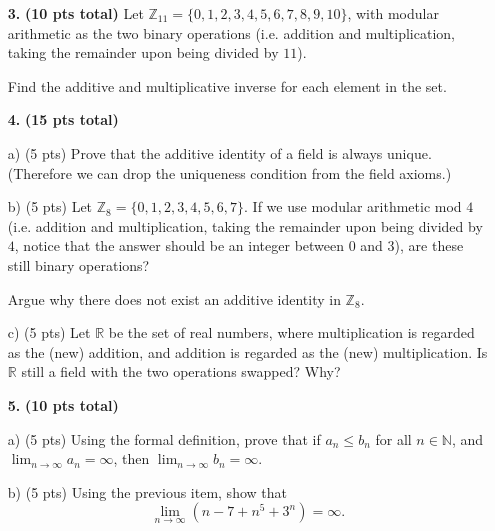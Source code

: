 \documentclass[12pt]{article}
\begin{document}
\begin{itemize}
\vspace*{3mm} 

\item[{\bf 3.}] {\bf (10 pts total)} Let $\mathbb{Z}_{11}=\{0,1,2,3,4,5,6,7,8,9,10\}$, with modular arithmetic as the two binary operations (i.e. addition and multiplication, taking the remainder upon being divided by $11$).

Find the additive and multiplicative inverse for each element in the set.


\vspace*{2mm} 
\item[{\bf 4.}] {\bf (15 pts total)}



a) (5 pts) Prove that the additive identity of a field is always unique. (Therefore we can drop the uniqueness condition from the field axioms.)

b) (5 pts) Let $\mathbb{Z}_{8}=\{0,1,2,3,4,5,6,7\}$. If we use modular arithmetic mod $4$ (i.e. addition and multiplication, taking the remainder upon being divided by $4$, notice that the answer should be an integer between $0$ and $3$), are these still binary operations?  

Argue why there does not exist an additive identity in $\mathbb{Z}_{8}$.

c) (5 pts)
Let $\mathbb{R}$ be the set of real numbers, where multiplication is regarded as the (new) addition, and addition is regarded as the (new) multiplication. Is $\mathbb{R}$ still a field with the two operations swapped? Why?


\item[{\bf 5.}] {\bf (10 pts total)}

a) (5 pts) Using the formal definition, prove that if $a_n\leq b_n$ for all $n\in \mathbb{N}$, and $\operatorname{lim}_{n\to \infty}a_n=\infty$, then $\operatorname{lim}_{n\to \infty}b_n=\infty$.


b)  (5 pts) Using the previous item, show that 
$$\lim_{n\rightarrow \infty} (n-7+n^5+3^n)=\infty .$$
\vspace*{2mm}





\end{itemize}
\end{document}
